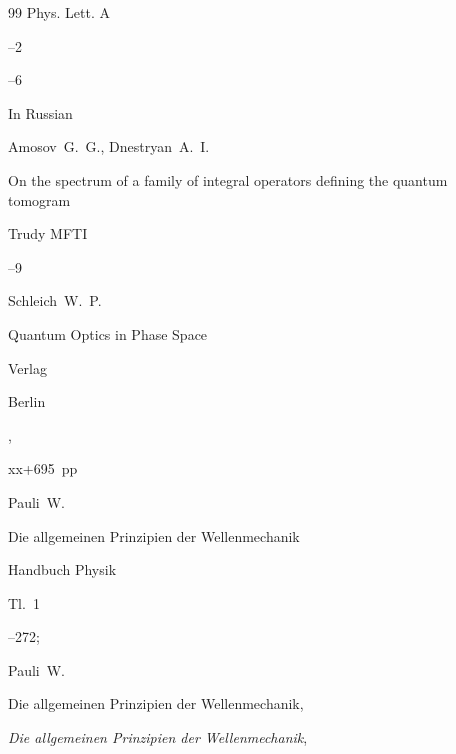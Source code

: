 \begin{thebibliography}{99}
 \jour Phys. Lett. A



--2

--6





\lang In Russian

\by  Amosov~G.~G., Dnestryan~A.~I.

\paper On the spectrum of a family of integral operators defining the quantum tomogram

\jour Trudy MFTI




--9






\by  Schleich~W.~P.

\book Quantum Optics in Phase Space

\publ Verlag 

\publaddr Berlin

,


xx+695~pp







\by Pauli~W.

\paper Die allgemeinen Prinzipien der Wellenmechanik


\jour Handbuch Physik 


\volinfo Tl.~1


--272;


 Pauli~W.


Die allgemeinen Prinzipien der Wellenmechanik,


{\it Die allgemeinen Prinzipien der Wellenmechanik},


\end{thebibliography}
